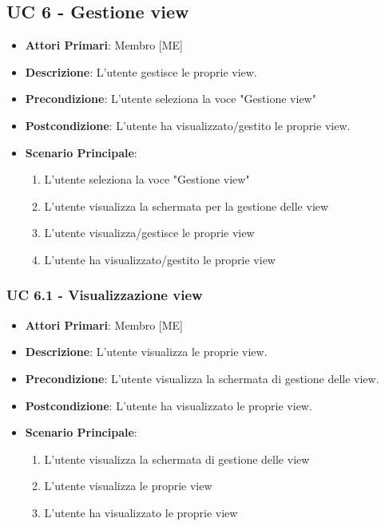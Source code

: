 	\subsection{UC 6 - Gestione view}
		\begin{itemize}
			\item \textbf{Attori Primari}: Membro [ME]
			\item \textbf{Descrizione}: L'utente gestisce le proprie view.
			\item \textbf{Precondizione}: L'utente seleziona la voce "Gestione view"
			\item \textbf{Postcondizione}: L'utente ha visualizzato/gestito le proprie view.
			\item \textbf{Scenario Principale}:
			\begin{enumerate}
				\item{L'utente seleziona la voce "Gestione view"}
				\item{L'utente visualizza la schermata per la gestione delle view}
				\item{L'utente visualizza/gestisce le proprie view}
				\item{L'utente ha visualizzato/gestito le proprie view}
			\end{enumerate}	
		\end{itemize}

			\subsubsection{UC 6.1 - Visualizzazione view}
			\begin{itemize}
				\item \textbf{Attori Primari}: Membro [ME]
				\item \textbf{Descrizione}: L'utente visualizza le proprie view.
				\item \textbf{Precondizione}: L'utente visualizza la schermata di gestione delle view.
				\item \textbf{Postcondizione}: L'utente ha visualizzato le proprie view.
				\item \textbf{Scenario Principale}:
				\begin{enumerate}
					\item{L'utente visualizza la schermata di gestione delle view}
					\item{L'utente visualizza le proprie view}
					\item{L'utente ha visualizzato le proprie view}
				\end{enumerate}	
			\end{itemize}

